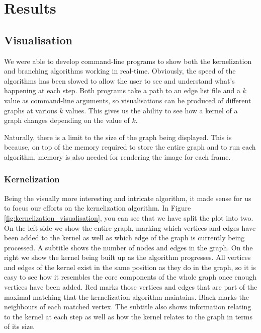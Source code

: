 \section{Results}

\subsection{Visualisation}

We were able to develop command-line programs to show both the kernelization
and branching algorithms working in real-time. Obviously, the speed of the
algorithms has been slowed to allow the user to see and understand what's
happening at each step. Both programs take a path to an edge list file and a
\(k\) value as command-line arguments, so visualisations can be produced of
different graphs at various \(k\) values. This gives us the ability to see how
a kernel of a graph changes depending on the value of \(k\).

Naturally, there is a limit to the size of the graph being displayed. This is
because, on top of the memory required to store the entire graph and to run
each algorithm, memory is also needed for rendering the image for each frame.

\subsubsection{Kernelization}

Being the visually more interesting and intricate algorithm, it made sense for
us to focus our efforts on the kernelization algorithm. In Figure
\ref{fig:kernelization_visualisation}, you can see that we have split the plot
into two. On the left side we show the entire graph, marking which vertices and
edges have been added to the kernel as well as which edge of the graph is
currently being processed. A subtitle shows the number of nodes and edges in
the graph. On the right we show the kernel being built up as the algorithm
progresses. All vertices and edges of the kernel exist in the same position as
they do in the graph, so it is easy to see how it resembles the core components
of the whole graph once enough vertices have been added. Red marks those
vertices and edges that are part of the maximal matching that the kernelization
algorithm maintains. Black marks the neighbours of each matched vertex. The
subtitle also shows information relating to the kernel at each step as well as
how the kernel relates to the graph in terms of its size.

